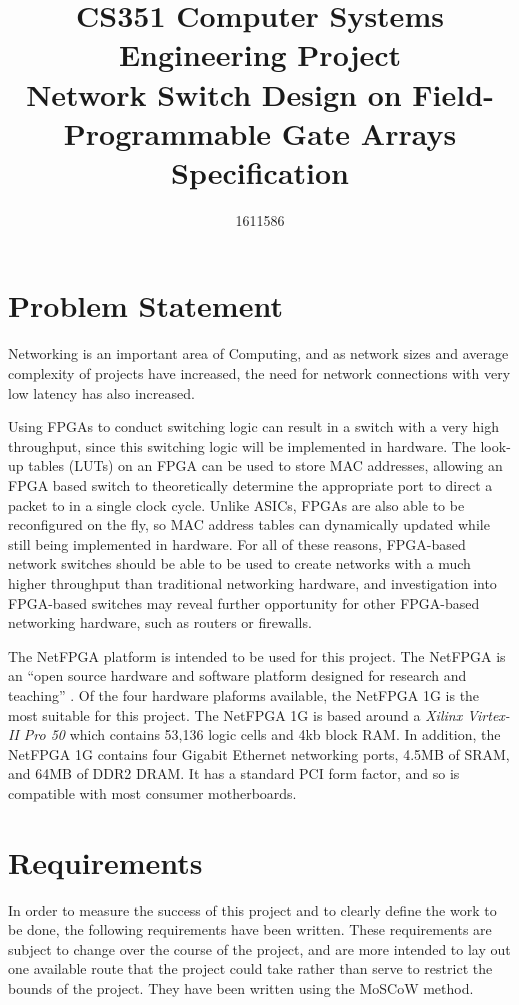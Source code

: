 \documentclass[12pt, a4paper, twoside, onecolumn]{article}
\title{CS351 Computer Systems Engineering Project \\ \vspace{0.5cm} Network Switch Design on Field-Programmable Gate Arrays \\ \vspace{0.3cm} \Large{Specification}}
\author{1611586}
\begin{document}


\tableofcontents
\newpage

\section{Problem Statement}
\label{problem_statement}
Networking is an important area of Computing, and as network sizes and average complexity of projects have increased,
the need for network connections with very low latency has also increased.

Using FPGAs to conduct switching logic can result in a switch with a very high throughput, since this switching logic will be implemented in hardware. The look-up tables (LUTs) on an FPGA can be used to store MAC addresses, allowing an FPGA based switch to theoretically determine the appropriate port to direct a packet to in a single clock cycle. Unlike ASICs, FPGAs are also able to be reconfigured on the fly, so MAC address tables can dynamically updated while still being implemented in hardware.
For all of these reasons, FPGA-based network switches should be able to be used to create networks with a much higher throughput than traditional networking hardware, and investigation into FPGA-based switches may reveal further opportunity for other FPGA-based networking hardware, such as routers or firewalls.

The NetFPGA \cite{NetFPGA} platform is intended to be used for this project. The NetFPGA is an ``open source hardware and software platform designed for research and teaching'' \cite{NetFPGA_about}. Of the four hardware plaforms available, the NetFPGA 1G \cite{NetFPGA_1G} is the most suitable for this project. The NetFPGA 1G is based around a \textit{Xilinx Virtex-II Pro 50} \cite{virtex2-pro} which contains 53,136 logic cells and 4kb block RAM. In addition, the NetFPGA 1G contains four Gigabit Ethernet networking ports, 4.5MB of SRAM, and 64MB of DDR2 DRAM. It has a standard PCI form factor, and so is compatible with most consumer motherboards.

\section{Requirements}
\label{requirements}
In order to measure the success of this project and to clearly define the work to be done, the following requirements have been written. These requirements are subject to change over the course of the project, and are more intended to lay out one available route that the project could take rather than serve to restrict the bounds of the project. They have been written using the MoSCoW method.
\end{document}
